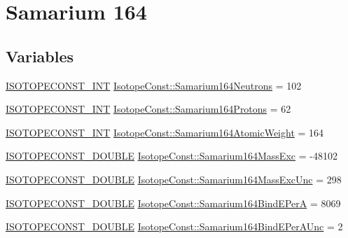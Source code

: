 \hypertarget{group___isotope_const-_samarium-_sm164}{}\section{Samarium 164}
\label{group___isotope_const-_samarium-_sm164}
\subsection*{Variables}
\begin{DoxyCompactItemize}
\item 
\mbox{\hyperlink{group___isotope_const-_macros_ga5f18360b3e99483a35c32d789e62621c}{I\+S\+O\+T\+O\+P\+E\+C\+O\+N\+S\+T\+\_\+\+I\+NT}} \mbox{\hyperlink{group___isotope_const-_samarium-_sm164_gaa74be8ea3d451a6d528ab0945bc38d2c}{Isotope\+Const\+::\+Samarium164\+Neutrons}} = 102
\item 
\mbox{\hyperlink{group___isotope_const-_macros_ga5f18360b3e99483a35c32d789e62621c}{I\+S\+O\+T\+O\+P\+E\+C\+O\+N\+S\+T\+\_\+\+I\+NT}} \mbox{\hyperlink{group___isotope_const-_samarium-_sm164_ga32c3745a017ecceb1304cf96a481da9b}{Isotope\+Const\+::\+Samarium164\+Protons}} = 62
\item 
\mbox{\hyperlink{group___isotope_const-_macros_ga5f18360b3e99483a35c32d789e62621c}{I\+S\+O\+T\+O\+P\+E\+C\+O\+N\+S\+T\+\_\+\+I\+NT}} \mbox{\hyperlink{group___isotope_const-_samarium-_sm164_gacd039961854b702bf13911307d5335dd}{Isotope\+Const\+::\+Samarium164\+Atomic\+Weight}} = 164
\item 
\mbox{\hyperlink{group___isotope_const-_macros_ga8f45a7272ce02c0b4c65c44636ed719a}{I\+S\+O\+T\+O\+P\+E\+C\+O\+N\+S\+T\+\_\+\+D\+O\+U\+B\+LE}} \mbox{\hyperlink{group___isotope_const-_samarium-_sm164_ga13ae771b1173d2642081cd2161b2e242}{Isotope\+Const\+::\+Samarium164\+Mass\+Exc}} = -\/48102
\item 
\mbox{\hyperlink{group___isotope_const-_macros_ga8f45a7272ce02c0b4c65c44636ed719a}{I\+S\+O\+T\+O\+P\+E\+C\+O\+N\+S\+T\+\_\+\+D\+O\+U\+B\+LE}} \mbox{\hyperlink{group___isotope_const-_samarium-_sm164_ga90de2766ce02115fd2054ca26aca03a9}{Isotope\+Const\+::\+Samarium164\+Mass\+Exc\+Unc}} = 298
\item 
\mbox{\hyperlink{group___isotope_const-_macros_ga8f45a7272ce02c0b4c65c44636ed719a}{I\+S\+O\+T\+O\+P\+E\+C\+O\+N\+S\+T\+\_\+\+D\+O\+U\+B\+LE}} \mbox{\hyperlink{group___isotope_const-_samarium-_sm164_gab9d6d6211277f1d0fbb071228928171a}{Isotope\+Const\+::\+Samarium164\+Bind\+E\+PerA}} = 8069
\item 
\mbox{\hyperlink{group___isotope_const-_macros_ga8f45a7272ce02c0b4c65c44636ed719a}{I\+S\+O\+T\+O\+P\+E\+C\+O\+N\+S\+T\+\_\+\+D\+O\+U\+B\+LE}} \mbox{\hyperlink{group___isotope_const-_samarium-_sm164_gae66bed5e422be94b5c05d17460d96b6c}{Isotope\+Const\+::\+Samarium164\+Bind\+E\+Per\+A\+Unc}} = 2

\end{DoxyCompactItemize}
